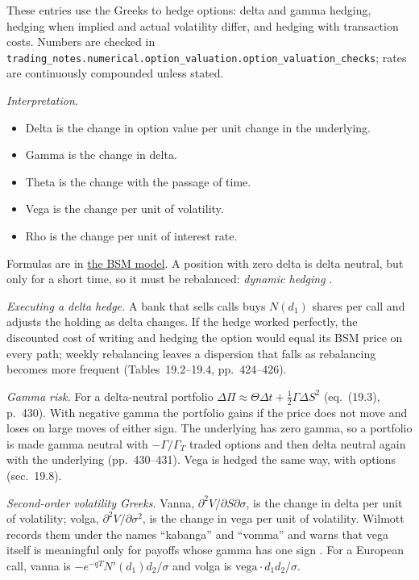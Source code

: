 These entries use the Greeks to hedge options: delta and gamma hedging, hedging when implied and actual volatility differ, and hedging with transaction costs. Numbers are checked in \nolinkurl{trading_notes.numerical.option_valuation.option_valuation_checks}; rates are continuously compounded unless stated.

\begin{qfmethod}\label{meth:greeks-delta-gamma-hedging}
 \emph{Interpretation.}
\begin{itemize}
\item Delta is the change in option value per unit change in the underlying.
\item Gamma is the change in delta.
\item Theta is the change with the passage of time.
\item Vega is the change per unit of volatility.
\item Rho is the change per unit of interest rate.
\end{itemize}
Formulas are in \hyperref[mod:black-scholes-merton]{the BSM model}. A position with zero delta is delta neutral, but only for a short time, so it must be rebalanced: \emph{dynamic hedging} \citep[chap.~19, sec.~19.4, pp.~421--427]{s7-hulloptions}.

\emph{Executing a delta hedge.} A bank that sells calls buys $N(d_1)$ shares per call and adjusts the holding as delta changes. If the hedge worked perfectly, the discounted cost of writing and hedging the option would equal its BSM price on every path; weekly rebalancing leaves a dispersion that falls as rebalancing becomes more frequent (Tables~19.2--19.4, pp.~424--426).

\emph{Gamma risk.} For a delta-neutral portfolio $\Delta\Pi\approx\Theta\Delta t+\tfrac12\Gamma\Delta S^2$ (eq.~(19.3), p.~430). With negative gamma the portfolio gains if the price does not move and loses on large moves of either sign. The underlying has zero gamma, so a portfolio is made gamma neutral with $-\Gamma/\Gamma_T$ traded options and then delta neutral again with the underlying (pp.~430--431). Vega is hedged the same way, with options (sec.~19.8).

\emph{Second-order volatility Greeks.} Vanna, $\partial^2V/\partial S\partial\sigma$, is the change in delta per unit of volatility; volga, $\partial^2V/\partial\sigma^2$, is the change in vega per unit of volatility. Wilmott records them under the names ``kabanga'' and ``vomma'' and warns that vega itself is meaningful only for payoffs whose gamma has one sign \citep[chap.~7, pp.~127--128 and n.~3]{wide-wilmott-pwoqf}. For a European call, vanna is $-e^{-qT}N'(d_1)d_2/\sigma$ and volga is $\text{vega}\cdot d_1d_2/\sigma$.


\end{qfmethod}
